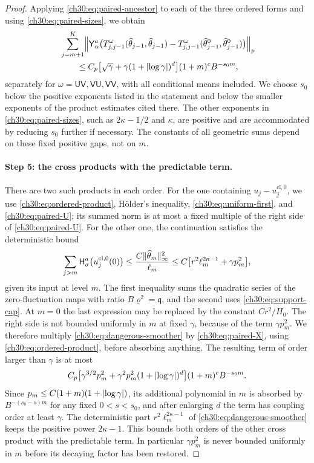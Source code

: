 \begin{proof}
Applying \eqref{ch30:eq:paired-ancestor} to each of the three ordered forms and using \eqref{ch30:eq:paired-sizes}, we obtain
\begin{equation}\label{ch30:eq:paired-three}
 \begin{split}
 &\sum_{j=m+1}^K\Bigl\lVert\mathsf Y_\alpha^a\bigl(T^\omega_{j,j-1}(\widehat\theta_{j-1},\widehat\theta_{j-1})-T^\omega_{j,j-1}(\widehat\theta_{j-1}^0,\widehat\theta_{j-1}^0)\bigr)\Bigr\rVert_p\\
 &\qquad\le C_p\bigl[\sqrt\gamma+\gamma(1+\lvert \log\gamma\rvert)^d\bigr](1+m)^cB^{-s_0m},
 \end{split}
\end{equation}
separately for $\omega=\mathsf{UV},\mathsf{VU},\mathsf{VV}$, with all conditional means included. We choose $s_0$ below the positive exponents listed in the statement and below the smaller exponents of the product estimates cited there. The other exponents in \eqref{ch30:eq:paired-sizes}, such as $2\kappa-1/2$ and $\kappa$, are positive and are accommodated by reducing $s_0$ further if necessary. The constants of all geometric sums depend on these fixed positive gaps, not on $m$.

\paragraph{Step 5: the cross products with the predictable term.} There are two such products in each order. For the one containing $u_j-u_j^{\mathrm{cl},0}$, we use \eqref{ch30:eq:ordered-product}, H\"older's inequality, \eqref{ch30:eq:uniform-first}, and \eqref{ch30:eq:paired-U}; its summed norm is at most a fixed multiple of the right side of \eqref{ch30:eq:paired-U}. For the other one, the continuation satisfies the deterministic bound
\begin{equation}\label{ch30:eq:dangerous-smoother}
 \sum_{j>m}\mathsf H_\sigma^a\bigl(u_j^{\mathrm{cl},0}(0)\bigr)\le\frac{C\lVert \widehat\theta_m\rVert_\infty^2}{\ell_m}\le C\bigl[r^2\ell_m^{2\kappa-1}+\gamma p_m^2\bigr],
\end{equation}
given its input at level $m$. The first inequality sums the quadratic series of the zero-fluctuation maps with ratio $B\varrho^2=\mathfrak q$, and the second uses \eqref{ch30:eq:support-cap}. At $m=0$ the last expression may be replaced by the constant $Cr^2/H_0$. The right side is not bounded uniformly in $m$ at fixed $\gamma$, because of the term $\gamma p_m^2$. We therefore multiply \eqref{ch30:eq:dangerous-smoother} by \eqref{ch30:eq:paired-X}, using \eqref{ch30:eq:ordered-product}, before absorbing anything. The resulting term of order larger than $\gamma$ is at most
\[
 C_p\bigl[\gamma^{3/2}p_m^2+\gamma^2p_m^2(1+\lvert \log\gamma\rvert)^d\bigr](1+m)^cB^{-s_0m}.
\]
Since $p_m\le C(1+m)(1+\lvert \log\gamma\rvert)$, its additional polynomial in $m$ is absorbed by $B^{-(s_0-s)m}$ for any fixed $0<s<s_0$, and after enlarging $d$ the term has coupling order at least $\gamma$. The deterministic part $r^2\ell_m^{2\kappa-1}$ of \eqref{ch30:eq:dangerous-smoother} keeps the positive power $2\kappa-1$. This bounds both orders of the other cross product with the predictable term. In particular $\gamma p_m^2$ is never bounded uniformly in $m$ before its decaying factor has been restored.


\end{proof}

